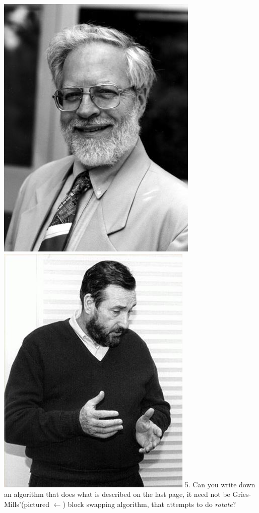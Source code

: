 \documentclass[12pt]{article}
\begin{document}
\newpage
\includegraphics[scale = 0.25]{gries.jpg}\includegraphics[scale = 0.25]{mills.jpg}
5. Can you write down an algorithm that does what is described on the last page, it need not be Gries-Mills'(pictured $\leftarrow$) block swapping algorithm, that attempts to do \textit{rotate}?
\newpage
\end{document}
